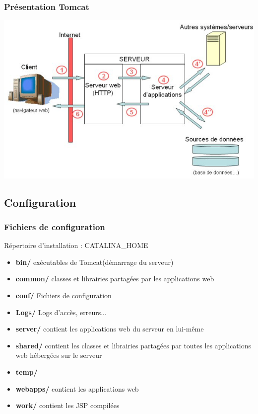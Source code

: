 \begin{frame}
  \frametitle{Présentation Tomcat}
  \includegraphics[scale=0.5]{Images/serveurapp.png}
\end{frame}

\subsection{Configuration}
\begin{frame}
  \frametitle{Fichiers de configuration}

		Répertoire d'installation : CATALINA\_HOME
\begin{itemize} 
    \item \textbf{bin/} exécutables de Tomcat(démarrage du serveur)
    \item \textbf{common/} classes et librairies partagées par les applications web
    \item \textbf{conf/} Fichiers de configuration
    \item \textbf{Logs/} Logs d'accès, erreurs...
    \item \textbf{server/} contient les applications web du serveur en lui-même
    \item \textbf{shared/} contient les classes et librairies partagées par toutes les applications web hébergées sur le serveur
    \item \textbf{temp/}
    \item \textbf{webapps/} contient les applications web
    \item \textbf{work/} contient les JSP compilées
\end{itemize} 
\end{frame}


